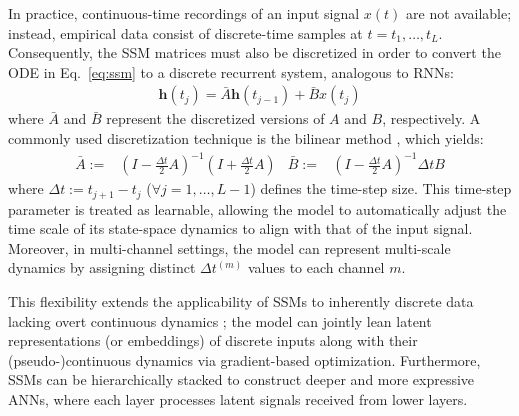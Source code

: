 \documentclass[10pt,letterpaper]{article}
\begin{document}
In practice, continuous-time recordings of an input signal $x(t)$ are not available; instead, empirical data consist of discrete-time samples at $t = t_1, \dots, t_L$.
Consequently, the SSM matrices must also be discretized in order to convert the ODE in Eq.~\ref{eq:ssm} to a discrete recurrent system, analogous to RNNs:
\begin{align}
	\mathbf{h}(t_j) = \bar{A} \mathbf{h}(t_{j-1}) + \bar{B} x(t_j)
	\label{eq:ssm_disc}
\end{align}
where $\bar{A}$ and $\bar{B}$ represent the discretized versions of $A$ and $B$, respectively.
A commonly used discretization technique is the bilinear method \citep{Tustin47}, which yields:
\begin{align*}
	\bar{A} :=&
		\left(I - \frac{\Delta t}{2} A\right)^{-1}
		\left(I + \frac{\Delta t}{2} A\right)
		&
	\bar{B} :=&
		\left(I - \frac{\Delta t}{2} A\right)^{-1}
		\Delta t B
\end{align*}
where $\Delta t:= t_{j+1} - t_{j}$ ($\forall j = 1,\dots,L-1$) defines the time-step size.
This time-step parameter is treated as learnable, allowing the model to automatically adjust the time scale of its state-space dynamics to align with that of the input signal.
Moreover, in multi-channel settings, the model can represent multi-scale dynamics by assigning distinct $\Delta t^{(m)}$ values to each channel $m$.


This flexibility extends the applicability of SSMs to inherently discrete data lacking overt continuous dynamics \citep[e.g., text languages;][]{GuDao24,DaoGu24}; the model can jointly lean latent representations (or embeddings) of discrete inputs along with their (pseudo-)continuous dynamics via gradient-based optimization.
Furthermore, SSMs can be hierarchically stacked to construct deeper and more expressive ANNs, where each layer processes latent signals received from lower layers.
\end{document}
